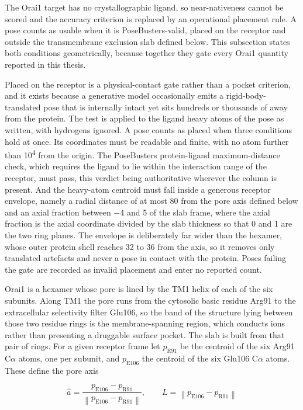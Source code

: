 The Orai1 target has no crystallographic ligand, so near-nativeness cannot be scored and the accuracy criterion is replaced by an operational placement rule. A pose counts as usable when it is PoseBusters-valid, placed on the receptor and outside the transmembrane exclusion slab defined below. This subsection states both conditions geometrically, because together they gate every Orai1 quantity reported in this thesis.

Placed on the receptor is a physical-contact gate rather than a pocket criterion, and it exists because a generative model occasionally emits a rigid-body-translated pose that is internally intact yet sits hundreds or thousands of \angstrom{} away from the protein. The test is applied to the ligand heavy atoms of the pose as written, with hydrogens ignored. A pose counts as placed when three conditions hold at once. Its coordinates must be readable and finite, with no atom further than 10\textsuperscript{4}\angstrom{} from the origin. The PoseBusters protein-ligand maximum-distance check, which requires the ligand to lie within the interaction range of the receptor, must pass, this verdict being authoritative wherever the column is present. And the heavy-atom centroid must fall inside a generous receptor envelope, namely a radial distance of at most 80\angstrom{} from the pore axis defined below and an axial fraction between \ensuremath{-}4 and 5 of the slab frame, where the axial fraction is the axial coordinate divided by the slab thickness so that 0 and 1 are the two ring planes. The envelope is deliberately far wider than the hexamer, whose outer protein shell reaches 32 to 36\angstrom{} from the axis, so it removes only translated artefacts and never a pose in contact with the protein. Poses failing the gate are recorded as invalid placement and enter no reported count.

Orai1 is a hexamer whose pore is lined by the TM1 helix of each of the six subunits. Along TM1 the pore runs from the cytosolic basic residue Arg91 to the extracellular selectivity filter Glu106, so the band of the structure lying between those two residue rings is the membrane-spanning region, which conducts ions rather than presenting a druggable surface pocket. The slab is built from that pair of rings. For a given receptor frame let \(p_{\text{R91}}\) be the centroid of the six Arg91 C\ensuremath{\alpha} atoms, one per subunit, and \(p_{\text{E106}}\) the centroid of the six Glu106 C\ensuremath{\alpha} atoms. These define the pore axis

\[\hat{a} = \frac{p_{\text{E106}} - p_{\text{R91}}}{\left\| p_{\text{E106}} - p_{\text{R91}} \right\|},\qquad L = \left\| p_{\text{E106}} - p_{\text{R91}} \right\|\]

